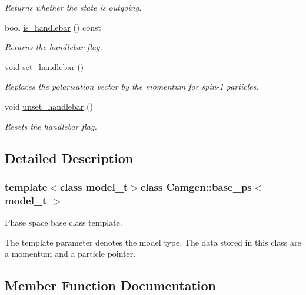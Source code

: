 \begin{DoxyCompactItemize}
\begin{DoxyCompactList}\small\item\em Returns whether the state is outgoing. \end{DoxyCompactList}\item 
\hypertarget{a00019_a3d66f467bc2edea81bfc204e547dce74}{}bool \hyperlink{a00019_a3d66f467bc2edea81bfc204e547dce74}{is\+\_\+handlebar} () const \label{a00019_a3d66f467bc2edea81bfc204e547dce74}

\begin{DoxyCompactList}\small\item\em Returns the handlebar flag. \end{DoxyCompactList}\item 
void \hyperlink{a00019_a382906c0a7eced326176cdf9386ce863}{set\+\_\+handlebar} ()
\begin{DoxyCompactList}\small\item\em Replaces the polarisation vector by the momentum for spin-\/1 particles. \end{DoxyCompactList}\item 
\hypertarget{a00019_acbcf2413e5415087ac2e3f67c82ee3bf}{}void \hyperlink{a00019_acbcf2413e5415087ac2e3f67c82ee3bf}{unset\+\_\+handlebar} ()\label{a00019_acbcf2413e5415087ac2e3f67c82ee3bf}

\begin{DoxyCompactList}\small\item\em Resets the handlebar flag. \end{DoxyCompactList}\end{DoxyCompactItemize}


\subsection{Detailed Description}
\subsubsection*{template$<$class model\+\_\+t$>$class Camgen\+::base\+\_\+ps$<$ model\+\_\+t $>$}

Phase space base class template. 

The template parameter denotes the model type. The data stored in this class are a momentum and a particle pointer. 

\subsection{Member Function Documentation}
\hypertarget{a00019_a382906c0a7eced326176cdf9386ce863}{}
